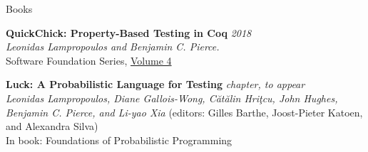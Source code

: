 \documentclass{resume} %
\begin{document}

\newcommand{\Catalin}{C\u{a}t\u{a}lin\xspace}
\newcommand{\Hritcu}{Hri\c{t}cu\xspace}
\newcommand{\Denes}{D\'en\`es\xspace}

\newcommand{\pub}[4]{
  {\bf #1} \hfill {\href{https://lemonidas.github.io/pdf/#2}{\bf \em #4}}\\
  {#3}
  }

\newcommand{\pubtwo}[6]{
  {\bf #1} \hfill {\href{https://lemonidas.github.io/pdf/#2}{\bf \em #4}}, {\href{https://lemonidas.github.io/pdf/#5}{\bf \em #6}}\\
  {#3}
  }

\newcommand{\pubsub}[5]{
  {\bf #1:} \hfill {\href{https://lemonidas.github.io/pdf/#2}{\bf \em #4}}\\
  {\bf #5}\\
  {#3}
  }

\begin{rSection}{Books}

  {\bf QuickChick: Property-Based Testing in Coq} \hfill {\em 2018}\\
  {\em Leonidas Lampropoulos and Benjamin C. Pierce.}\\
  {Software Foundation Series, \href{https://softwarefoundations.cis.upenn.edu}{Volume 4}}

  {\bf Luck: A Probabilistic Language for Testing} \hfill {\em chapter, to appear}\\
  {\em Leonidas Lampropoulos, Diane Gallois-Wong, C\u{a}t\u{a}lin Hri\c{t}cu, John Hughes, Benjamin C. Pierce, and Li-yao Xia} {(editors: Gilles Barthe, Joost-Pieter Katoen, and Alexandra Silva)}\\
  In book: {Foundations of Probabilistic Programming} \\

\clearpage
  
\end{rSection}
\end{document}
